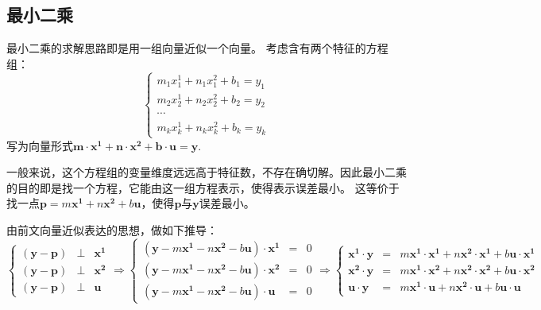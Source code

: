 \documentclass{article}
\begin{document}
\begin{CJK}{UTF8}{gbsn}
\section{最小二乘}
	最小二乘的求解思路即是用一组向量近似一个向量。
	考虑含有两个特征的方程组：
	$$\left\{\begin{aligned}m_1x^1_1+n_1x^2_1+b_1=y_1\\m_2x^1_2+n_2x^2_2+b_2=y_2\\ \cdots\\m_kx^1_k+n_kx^2_k+b_k=y_k\end{aligned}\right.$$
	写为向量形式$\boldsymbol{m}\cdot\boldsymbol{x^1}+\boldsymbol{n}\cdot\boldsymbol{x^2}+\boldsymbol{b}\cdot\boldsymbol{u}=\boldsymbol{y}$.\par
	一般来说，这个方程组的变量维度远远高于特征数，不存在确切解。因此最小二乘的目的即是找一个方程，它能由这一组方程表示，使得表示误差最小。
	这等价于找一点$\boldsymbol{p}=m\boldsymbol{x^1}+n\boldsymbol{x^2}+b\boldsymbol{u}$，使得$\boldsymbol{p}$与$\boldsymbol{y}$误差最小。\par
	由前文向量近似表达的思想，做如下推导：
	$$\left\{\begin{aligned}(\boldsymbol{y}-\boldsymbol{p})&\perp&\boldsymbol{x^1}\\
	(\boldsymbol{y}-\boldsymbol{p})&\perp&\boldsymbol{x^2}\\
	(\boldsymbol{y}-\boldsymbol{p})&\perp&\boldsymbol{u}\end{aligned}\right.
	\Rightarrow
	\left\{\begin{aligned}(\boldsymbol{y}-m\boldsymbol{x^1}-n\boldsymbol{x^2}-b\boldsymbol{u})\cdot\boldsymbol{x^1} &=& 0\\
	(\boldsymbol{y}-m\boldsymbol{x^1}-n\boldsymbol{x^2}-b\boldsymbol{u})\cdot\boldsymbol{x^2} &=& 0\\
	(\boldsymbol{y}-m\boldsymbol{x^1}-n\boldsymbol{x^2}-b\boldsymbol{u})\cdot\boldsymbol{u} &=& 0\end{aligned}\right.
	\Rightarrow
	\left\{\begin{aligned}\boldsymbol{x^1}\cdot\boldsymbol{y} &=& m\boldsymbol{x^1}\cdot\boldsymbol{x^1}+n\boldsymbol{x^2}\cdot\boldsymbol{x^1}+b\boldsymbol{u}\cdot\boldsymbol{x^1}\\
	\boldsymbol{x^2}\cdot\boldsymbol{y} &=& m\boldsymbol{x^1}\cdot\boldsymbol{x^2}+n\boldsymbol{x^2}\cdot\boldsymbol{x^2}+b\boldsymbol{u}\cdot\boldsymbol{x^2}\\
	\boldsymbol{u}\cdot\boldsymbol{y} &=& m\boldsymbol{x^1}\cdot\boldsymbol{u}+n\boldsymbol{x^2}\cdot\boldsymbol{u}+b\boldsymbol{u}\cdot\boldsymbol{u}\end{aligned}\right.$$

\end{CJK}
\end{document}
